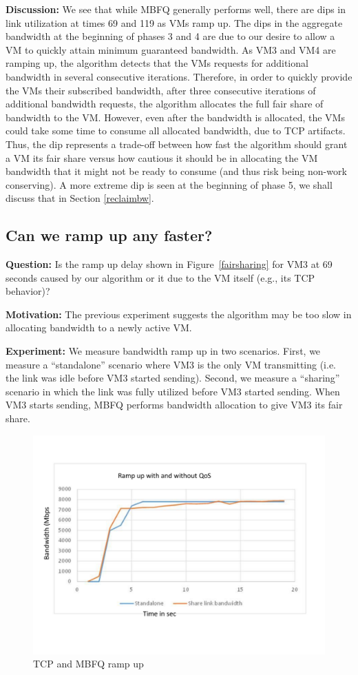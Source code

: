{\bf Discussion:} We see that while MBFQ generally performs well, there are dips
in link utilization at times 69 and 119 as VMs ramp up. The dips in the aggregate
bandwidth at the beginning of phases 3
and 4 are due to our desire to allow a VM to quickly attain minimum
guaranteed bandwidth. As VM3 and VM4 are ramping up, the algorithm detects that
the VMs requests for additional bandwidth in several consecutive iterations.
Therefore, in order to quickly provide the VMs their subscribed bandwidth, after
three consecutive iterations of additional bandwidth requests, the algorithm
allocates the full fair share of bandwidth to the VM. However, even after
    the bandwidth is allocated, the VMs could take some time to consume all allocated
bandwidth, due to
TCP artifacts. Thus, the dip represents a trade-off between how fast the
algorithm should grant a VM its fair share versus how cautious it should be in
allocating the VM bandwidth that it might not be ready to consume (and thus risk
being non-work conserving). A more extreme dip is seen at the
beginning of phase 5, we shall discuss that in Section \ref{reclaimbw}.

\subsection{Can we ramp up any faster?}

{\bf Question:}  Is the ramp up delay shown in Figure~\ref{fairsharing} for VM3
at 69 seconds caused by our algorithm or it due to the VM itself (e.g., its TCP
behavior)?

{\bf Motivation:} The previous experiment suggests the algorithm may be too slow
in allocating bandwidth to a newly active VM.  

{\bf Experiment:} We measure bandwidth ramp up in two scenarios.  First, we
measure a  ``standalone'' scenario where VM3 is the only VM transmitting (i.e. the link
was idle before VM3 started sending).  Second, we measure a  ``sharing'' scenario
in which the link was fully utilized before VM3 started sending. When VM3 starts
sending, MBFQ performs bandwidth allocation to give VM3 its fair share.

\begin{figure}[h]
\centering
\includegraphics[width=0.7\columnwidth,trim=60pt 40mm 0pt 8mm]{figures/rampupcomparison}
\caption{TCP and MBFQ ramp up}
\label{rampupcomparison}
\vspace{-3mm}
\end{figure}

